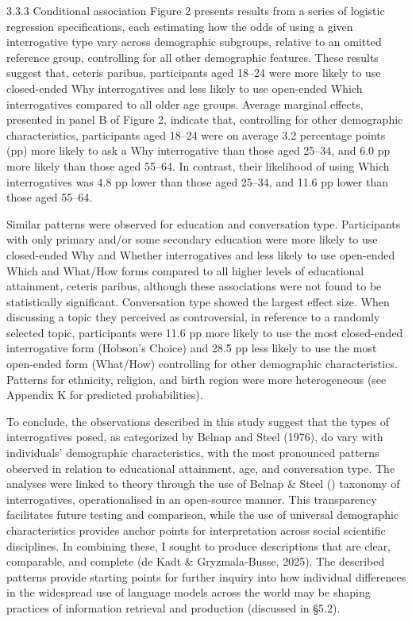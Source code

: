 \documentclass[
  12pt,
]{article}
\begin{document}
3.3.3 Conditional association
Figure 2 presents results from a series of logistic regression specifications, each estimating how the odds of using a given interrogative type vary across demographic subgroups, relative to an omitted reference group, controlling for all other demographic features. These results suggest that, ceteris paribus, participants aged 18--24 were more likely to use closed-ended Why interrogatives and less likely to use open-ended Which interrogatives compared to all older age groups. Average marginal effects, presented in panel B of Figure 2, indicate that, controlling for other demographic characteristics, participants aged 18--24 were on average 3.2 percentage points (pp) more likely to ask a Why interrogative than those aged 25--34, and 6.0 pp more likely than those aged 55--64. In contrast, their likelihood of using Which interrogatives was 4.8 pp lower than those aged 25--34, and 11.6 pp lower than those aged 55--64.

Similar patterns were observed for education and conversation type. Participants with only primary and/or some secondary education were more likely to use closed-ended Why and Whether interrogatives and less likely to use open-ended Which and What/How forms compared to all higher levels of educational attainment, ceteris paribus, although these associations were not found to be statistically significant. Conversation type showed the largest effect size. When discussing a topic they perceived as controversial, in reference to a randomly selected topic, participants were 11.6 pp more likely to use the most closed-ended interrogative form (Hobson's Choice) and 28.5 pp less likely to use the most open-ended form (What/How) controlling for other demographic characteristics. Patterns for ethnicity, religion, and birth region were more heterogeneous (see Appendix K for predicted probabilities).

To conclude, the observations described in this study suggest that the types of interrogatives posed, as categorized by Belnap and Steel (1976), do vary with individuals' demographic characteristics, with the most pronounced patterns observed in relation to educational attainment, age, and conversation type. The analyses were linked to theory through the use of Belnap \& Steel () taxonomy of interrogatives, operationalised in an open-source manner. This transparency facilitates future testing and comparison, while the use of universal demographic characteristics provides anchor points for interpretation across social scientific disciplines. In combining these, I sought to produce descriptions that are clear, comparable, and complete (de Kadt \& Gryzmala-Busse, 2025). The described patterns provide starting points for further inquiry into how individual differences in the widespread use of language models across the world may be shaping practices of information retrieval and production (discussed in §5.2).
\end{document}
